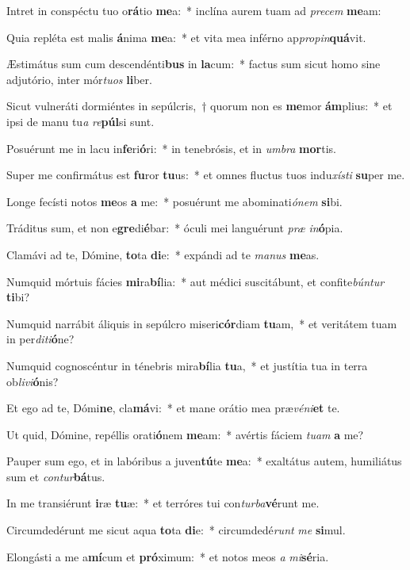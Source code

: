 \item Intret in conspéctu tuo o\textbf{rá}tio \textbf{me}a:~* inclína aurem tuam ad \textit{pre}\textit{cem} \textbf{me}am:
\item Quia repléta est malis \textbf{á}nima \textbf{me}a:~* et vita mea inférno ap\textit{pro}\textit{pin}\textbf{quá}vit.
\item Æstimátus sum cum descendénti\textbf{bus} in \textbf{la}cum:~* factus sum sicut homo sine adjutório, inter mór\textit{tu}\textit{os} \textbf{li}ber.
\item Sicut vulneráti dormiéntes in sepúlcris,~† quorum non es \textbf{me}mor \textbf{ám}plius:~* et ipsi de manu tu\textit{a} \textit{re}\textbf{púl}si sunt.
\item Posuérunt me in lacu in\textbf{fe}ri\textbf{ó}ri:~* in tenebrósis, et in \textit{um}\textit{bra} \textbf{mor}tis.
\item Super me confirmátus est \textbf{fu}ror \textbf{tu}us:~* et omnes fluctus tuos indu\textit{xís}\textit{ti} \textbf{su}per me.
\item Longe fecísti notos \textbf{me}os \textbf{a} me:~* posuérunt me abominati\textit{ó}\textit{nem} \textbf{si}bi.
\item Tráditus sum, et non e\textbf{gre}di\textbf{é}bar:~* óculi mei languérunt \textit{præ} \textit{in}\textbf{ó}pia.
\item Clamávi ad te, Dómine, \textbf{to}ta \textbf{di}e:~* expándi ad te \textit{ma}\textit{nus} \textbf{me}as.
\item Numquid mórtuis fácies \textbf{mi}ra\textbf{bí}lia:~* aut médici suscitábunt, et confite\textit{bún}\textit{tur} \textbf{ti}bi?
\item Numquid narrábit áliquis in sepúlcro miseri\textbf{cór}diam \textbf{tu}am,~* et veritátem tuam in per\textit{di}\textit{ti}\textbf{ó}ne?
\item Numquid cognoscéntur in ténebris mira\textbf{bí}lia \textbf{tu}a,~* et justítia tua in terra ob\textit{li}\textit{vi}\textbf{ó}nis?
\item Et ego ad te, Dómi\textbf{ne}, cla\textbf{má}vi:~* et mane orátio mea præ\textit{vé}\textit{ni}\textbf{et} te.
\item Ut quid, Dómine, repéllis orati\textbf{ó}nem \textbf{me}am:~* avértis fáciem \textit{tu}\textit{am} \textbf{a} me?
\item Pauper sum ego, et in labóribus a juven\textbf{tú}te \textbf{me}a:~* exaltátus autem, humiliátus sum et \textit{con}\textit{tur}\textbf{bá}tus.
\item In me transiérunt \textbf{i}ræ \textbf{tu}æ:~* et terróres tui con\textit{tur}\textit{ba}\textbf{vé}runt me.
\item Circumdedérunt me sicut aqua \textbf{to}ta \textbf{di}e:~* circumdedé\textit{runt} \textit{me} \textbf{si}mul.
\item Elongásti a me a\textbf{mí}cum et \textbf{pró}ximum:~* et notos meos \textit{a} \textit{mi}\textbf{sé}ria.
